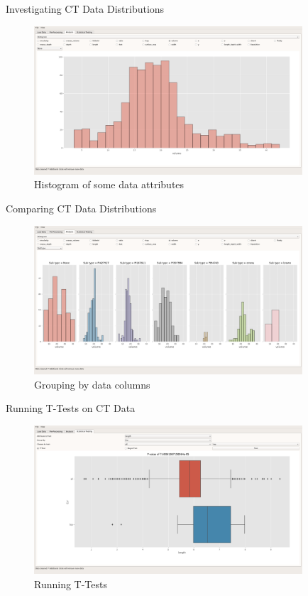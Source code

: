 \documentclass[t, aspectratio=169]{beamer}
\begin{document}
\begin{frame}[label={sec:orgb622236}]{Investigating CT Data Distributions}
\begin{figure}[htbp]
\centering
\includegraphics[width=10cm]{./images/2.png}
\caption{\label{fig:orgaa71575}
Histogram of some data attributes}
\end{figure}
\end{frame}


\begin{frame}[label={sec:org3c5e783}]{Comparing CT Data Distributions}
\begin{figure}[htbp]
\centering
\includegraphics[width=10cm]{./images/3.png}
\caption{\label{fig:org2c58578}
Grouping by data columns}
\end{figure}
\end{frame}


\begin{frame}[label={sec:org7449267}]{Running T-Tests on CT Data}
\begin{figure}[htbp]
\centering
\includegraphics[width=10cm]{./images/4.png}
\caption{\label{fig:org4ed12a0}
Running T-Tests}
\end{figure}
\end{frame}
\end{document}
